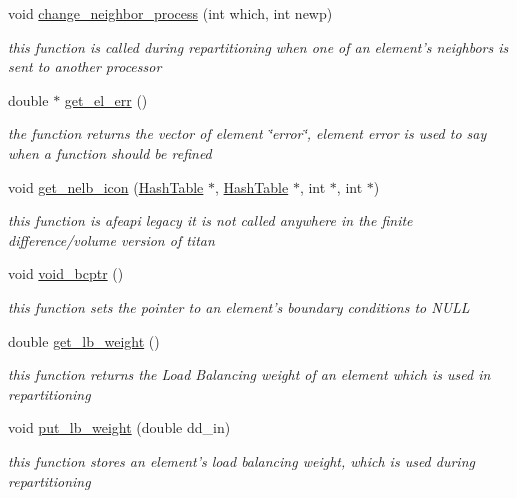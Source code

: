\begin{CompactItemize}
void \hyperlink{classElement_a50}{change\_\-neighbor\_\-process} (int which, int newp)
\begin{CompactList}\small\item\em this function is called during repartitioning when one of an element's neighbors is sent to another processor \item\end{CompactList}\item 
double $\ast$ \hyperlink{classElement_a51}{get\_\-el\_\-err} ()
\begin{CompactList}\small\item\em the function returns the vector of element \char`\"{}error\char`\"{}, element error is used to say when a function should be refined \item\end{CompactList}\item 
void \hyperlink{classElement_a52}{get\_\-nelb\_\-icon} (\hyperlink{classHashTable}{Hash\-Table} $\ast$, \hyperlink{classHashTable}{Hash\-Table} $\ast$, int $\ast$, int $\ast$)
\begin{CompactList}\small\item\em this function is afeapi legacy it is not called anywhere in the finite difference/volume version of titan \item\end{CompactList}\item 
void \hyperlink{classElement_a53}{void\_\-bcptr} ()
\begin{CompactList}\small\item\em this function sets the pointer to an element's boundary conditions to NULL \item\end{CompactList}\item 
double \hyperlink{classElement_a54}{get\_\-lb\_\-weight} ()
\begin{CompactList}\small\item\em this function returns the Load Balancing weight of an element which is used in repartitioning \item\end{CompactList}\item 
void \hyperlink{classElement_a55}{put\_\-lb\_\-weight} (double dd\_\-in)
\begin{CompactList}\small\item\em this function stores an element's load balancing weight, which is used during repartitioning \item\end{CompactList}\item 

\end{CompactItemize}
